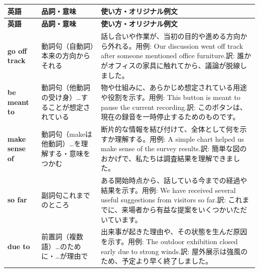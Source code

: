 \documentclass[a4paper,10pt]{ltjsarticle}
\makeatletter
\newcommand{\en}[1]{\textsf{\textbf{#1}}}
\newcommand{\ipa}{\ipafont\color{vgray}}
\newcommand{\pos}[1]{{\sffamily\mdseries\scriptsize\color{vhead}#1}}
\newlength{\vocabrowspace}
\newenvironment{vtab}{%
  \footnotesize
  \setlength{\vocabrowspace}{\baselineskip}
  \setlength{\tabcolsep}{4pt}
  \renewcommand{\arraystretch}{1.18}
  \begin{longtable}{@{}>{\raggedright}p{0.265\textwidth}>{\raggedright}p{0.205\textwidth}>{\raggedright\arraybackslash}p{0.475\textwidth}@{}}
  \toprule
  \sffamily\bfseries 英語 & \sffamily\bfseries 品詞・意味 & \sffamily\bfseries 使い方・オリジナル例文 \\
  \midrule
  \endfirsthead
  \toprule
  \sffamily\bfseries 英語 & \sffamily\bfseries 品詞・意味 & \sffamily\bfseries 使い方・オリジナル例文 \\
  \midrule
  \endhead
  \bottomrule
  \endfoot
}{%
  \end{longtable}
}
\newcommand{\ipastrut}{\rule{0pt}{1.45em}}
\makeatother
\begin{document}
\begin{vtab}
\addlinespace[\vocabrowspace]
\en{go off track}\newline{\ipa \ipastrut /ɡoʊ ɔf træk/} & \pos{動詞句（自動詞）}\newline 本来の方向からそれる & 話し合いや作業が、当初の目的や進める方向から外れる。\newline 用例: Our discussion went off track after someone mentioned office furniture.\newline 訳: 誰かがオフィスの家具に触れてから、議論が脱線しました。 \\
\addlinespace[\vocabrowspace]
\en{be meant to}\newline{\ipa \ipastrut /bi mɛnt tu/} & \pos{動詞句（他動詞の受け身）}\newline …することが想定されている & 物や仕組みに、あらかじめ想定されている用途や役割を示す。\newline 用例: This button is meant to pause the current recording.\newline 訳: このボタンは、現在の録音を一時停止するためのものです。 \\
\addlinespace[\vocabrowspace]
\en{make sense of}\newline{\ipa \ipastrut /meɪk sɛns əv/} & \pos{動詞句（makeは他動詞）}\newline …を理解する・意味をつかむ & 断片的な情報を結び付けて、全体として何を示すか理解する。\newline 用例: A simple chart helped us make sense of the survey results.\newline 訳: 簡単な図のおかげで、私たちは調査結果を理解できました。 \\
\addlinespace[\vocabrowspace]
\en{so far}\newline{\ipa \ipastrut /soʊ fɑr/} & \pos{副詞句}\newline これまでのところ & ある開始時点から、話している今までの経過や結果を示す。\newline 用例: We have received several useful suggestions from visitors so far.\newline 訳: これまでに、来場者から有益な提案をいくつかいただいています。 \\
\addlinespace[\vocabrowspace]
\en{due to}\newline{\ipa \ipastrut /du tu/} & \pos{前置詞（複数語）}\newline …のために・…が理由で & 出来事が起きた理由や、その状態を生んだ原因を示す。\newline 用例: The outdoor exhibition closed early due to strong winds.\newline 訳: 屋外展示は強風のため、予定より早く終了しました。 \\

\end{vtab}
\end{document}
